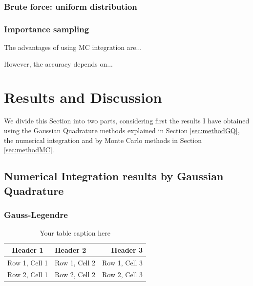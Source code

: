 \documentclass[aip,reprint]{revtex4-1}
\begin{document}
\subsubsection{Brute force: uniform distribution}

\subsubsection{Importance sampling}

The advantages of using MC integration are...

However, the accuracy depends on...

\section{Results and Discussion}\label{sec:results}

We divide this Section into two parts, considering first the results I have obtained using the Gaussian Quadrature methods explained in Section \ref{sec:methodGQ}, the numerical integration and by Monte Carlo methods in Section \ref{sec:methodMC}. 

\subsection{Numerical Integration results by Gaussian Quadrature}
\subsubsection{Gauss-Legendre}

\begin{table}[h] %
    \centering %
    \caption{Your table caption here} %
    \label{tab:my_table} %
    \begin{tabular}{|c|l|r|} %
        \hline %
        \textbf{Header 1} & \textbf{Header 2} & \textbf{Header 3} \\ %
        \hline %
        Row 1, Cell 1 & Row 1, Cell 2 & Row 1, Cell 3 \\
        Row 2, Cell 1 & Row 2, Cell 2 & Row 2, Cell 3 \\
        \hline %
    \end{tabular}
\end{table}
\end{document}
